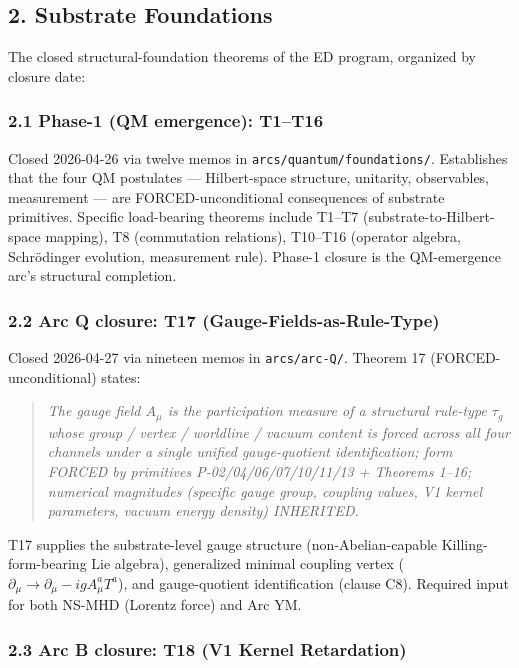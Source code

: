 \documentclass[
]{article}
\begin{document}
\subsection{2. Substrate Foundations}\label{substrate-foundations}

The closed structural-foundation theorems of the ED program, organized
by closure date:

\subsubsection{2.1 Phase-1 (QM emergence):
T1--T16}\label{phase-1-qm-emergence-t1t16}

Closed 2026-04-26 via twelve memos in
\texttt{arcs/quantum/foundations/}. Establishes that the four QM
postulates --- Hilbert-space structure, unitarity, observables,
measurement --- are FORCED-unconditional consequences of substrate
primitives. Specific load-bearing theorems include T1--T7
(substrate-to-Hilbert-space mapping), T8 (commutation relations),
T10--T16 (operator algebra, Schrödinger evolution, measurement rule).
Phase-1 closure is the QM-emergence arc's structural completion.

\subsubsection{2.2 Arc Q closure: T17
(Gauge-Fields-as-Rule-Type)}\label{arc-q-closure-t17-gauge-fields-as-rule-type}

Closed 2026-04-27 via nineteen memos in \texttt{arcs/arc-Q/}. Theorem 17
(FORCED-unconditional) states:

\begin{quote}
\emph{The gauge field \(A_\mu\) is the participation measure of a
structural rule-type \(\tau_g\) whose group / vertex / worldline /
vacuum content is forced across all four channels under a single unified
gauge-quotient identification; form FORCED by primitives
P-02/04/06/07/10/11/13 + Theorems 1--16; numerical magnitudes (specific
gauge group, coupling values, V1 kernel parameters, vacuum energy
density) INHERITED.}
\end{quote}

T17 supplies the substrate-level gauge structure (non-Abelian-capable
Killing-form-bearing Lie algebra), generalized minimal coupling vertex
(\(\partial_\mu \to \partial_\mu - igA_\mu^a T^a\)), and gauge-quotient
identification (clause C8). Required input for both NS-MHD (Lorentz
force) and Arc YM.

\subsubsection{2.3 Arc B closure: T18 (V1 Kernel
Retardation)}\label{arc-b-closure-t18-v1-kernel-retardation}
\end{document}

